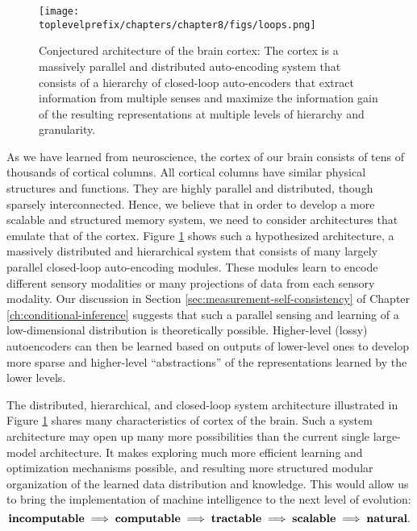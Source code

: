 \documentclass[../../book-main.tex]{subfiles}
\begin{document}
\begin{figure}[t]
\centering
\texttt{[image: \\toplevelprefix/chapters/chapter8/figs/loops.png]}
    \caption{Conjectured architecture of the brain cortex: The cortex is a massively parallel and distributed auto-encoding system that consists of a hierarchy of closed-loop auto-encoders that extract information from multiple senses and maximize the information  gain of the resulting representations at multiple levels of hierarchy and granularity.}
    \label{fig:loops}
\end{figure}
As we have learned from neuroscience, the cortex of our brain consists of tens of thousands of cortical columns. All cortical columns have similar physical structures and functions. They are highly parallel and distributed, though sparsely interconnected. Hence, we believe that in order to develop a more scalable and structured memory system, we need to consider architectures that emulate that of the cortex. Figure \ref{fig:loops} shows such a hypothesized architecture, a massively distributed and hierarchical system that consists of many largely parallel closed-loop auto-encoding modules. These modules learn to encode different sensory modalities or many projections of data from each sensory modality. Our discussion in Section \ref{sec:measurement-self-consistency} of Chapter \ref{ch:conditional-inference} suggests that such a parallel sensing and learning of a low-dimensional distribution is theoretically possible. Higher-level (lossy) autoencoders can then be learned based on outputs of lower-level ones to develop more sparse and higher-level  ``abstractions'' of the representations learned by the lower levels. 


The distributed, hierarchical, and closed-loop system architecture illustrated in Figure \ref{fig:loops} shares many characteristics of cortex of the brain. Such a system architecture may open up many more possibilities than the current single large-model architecture. It makes exploring much more efficient learning and optimization mechanisms possible, and resulting more structured modular organization of the learned data distribution and knowledge. This would allow us to bring the implementation of machine intelligence to the next level of evolution: 
\begin{equation}
   \mbox{\textbf{incomputable}} \;
   \Longrightarrow \; \mbox{\textbf{computable}} \;
   \Longrightarrow \; \mbox{\textbf{tractable}} \; \Longrightarrow \; 
   \mbox{\textbf{scalable}} \; \Longrightarrow \; 
   \mbox{\textbf{natural}}.
\end{equation}
\end{document}
